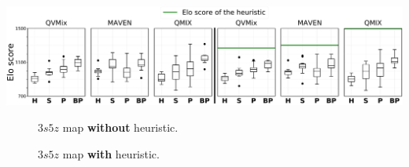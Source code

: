     

    \includegraphics[width=.95\textwidth]{tex_thesis/figures/ch7/3s5z_tiny_six_qvmix_maven_qmix.pdf}
    \begin{subfigure}{.045\textwidth}
    \centering
    \caption*{}
    \end{subfigure}%
    \begin{subfigure}{.455\textwidth}
        \begin{subfigure}{.33\textwidth}
            \renewcommand\thesubfigure{\alph{subfigure}.1}
          \centering
          \caption{}
          \label{subfig:3s5z_elo_no_h_methodQVMIX}
        \end{subfigure}%
        \begin{subfigure}{.33\textwidth}
        \addtocounter{subfigure}{-1}
            \renewcommand\thesubfigure{\alph{subfigure}.2}
          \centering
          \caption{}
          \label{subfig:3s5z_elo_no_h_methodMAVEN}
        \end{subfigure}%
        \begin{subfigure}{.33\textwidth}
        \addtocounter{subfigure}{-1}
            \renewcommand\thesubfigure{\alph{subfigure}.3}
          \centering
          \caption{}
          \label{subfig:3s5z_elo_no_h_methodQMIX}
        \end{subfigure}%
    \centering
    \addtocounter{subfigure}{-1}
    \caption{$3s5z$ map \textbf{without} heuristic.}
     \label{subfig:elo_no_h_3s5z}
    \end{subfigure}%
    \begin{subfigure}{.455\textwidth}
        \begin{subfigure}{.33\textwidth}
        \renewcommand\thesubfigure{\alph{subfigure}.1}
          \centering
          \caption{ }
          \label{subfig:3s5z_elo_h_methodQVMIX}
        \end{subfigure}%
        \begin{subfigure}{.33\textwidth}
         \addtocounter{subfigure}{-1}
        \renewcommand\thesubfigure{\alph{subfigure}.2}
          \centering
          \caption{ }
          \label{subfig:3s5z_elo_h_methodMAVEN}
        \end{subfigure}%
        \begin{subfigure}{.33\textwidth}
            \addtocounter{subfigure}{-1}
            \renewcommand\thesubfigure{\alph{subfigure}.3}
          \centering
          \caption{ }
          \label{subfig:3s5z_elo_h_methodQMIX}
        \end{subfigure}%
    \centering
    \addtocounter{subfigure}{-1}
    \caption{$3s5z$ map \textbf{with} heuristic.}
     \label{subfig:elo_h_3s5z}
    \end{subfigure}%
    
